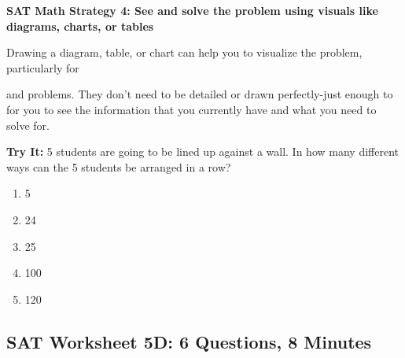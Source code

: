 \newpage
\textbf{SAT Math Strategy 4: See and solve the problem using visuals like diagrams, charts, or tables}

\bigskip
Drawing a diagram, table, or chart can help you to visualize the problem, particularly for

\longline and \longline problems. They don't need to be detailed or drawn perfectly-just enough to for you to see the information that you currently have and what you need to solve for.

\bigskip
\textbf{Try It:} 5 students are going to be lined up against a wall. In how many different ways can the 5 students be arranged in a row?

\begin{enumerate}[label=(\Alph*)]
\item 5
\item 24
\item 25
\item 100
\item 120
\end{enumerate}

\newpage
\subsection{SAT Worksheet 5D: 6 Questions, 8 Minutes}


